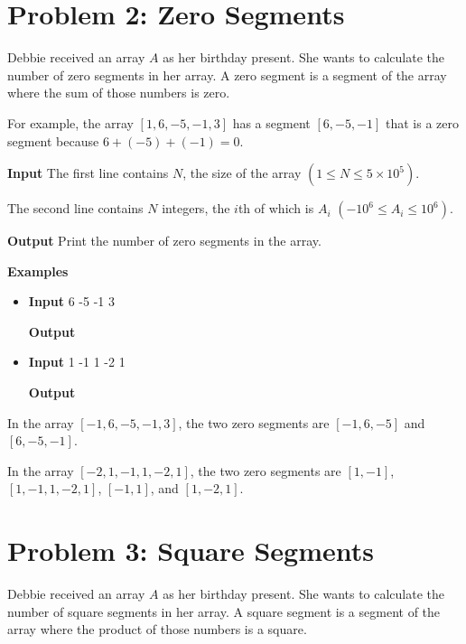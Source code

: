 \normalfont\documentclass[letterpaper,11pt]{article}
\begin{document}
\newpage

\section*{Problem 2: Zero Segments}
Debbie received an array $A$ as her birthday present. She wants to calculate the number of zero segments in her array. A zero segment is a segment of the array where the sum of those numbers is zero.

For example, the array $[1,6,-5,-1,3]$ has a segment $[6,-5,-1]$ that is a zero segment because $6 + (-5) + (-1) = 0$.

\textbf{Input} \newline
The first line contains $N$, the size of the array $(1 \leq N \leq 5 \times 10^5)$.

The second line contains $N$ integers, the $i$th of which is $A_i$ $(-10^6 \leq A_i \leq 10^6)$.

\textbf{Output} \newline
Print the number of zero segments in the array.

\textbf{Examples} \newline
\begin{itemize}
\item \textbf{Input}   6 -5 -1 3

\textbf{Output} 

\item \textbf{Input}   1 -1 1 -2 1

\textbf{Output} 
\end{itemize}

In the array $[-1, 6, -5, -1, 3]$, the two zero segments are $[-1, 6, -5]$ and $[6, -5, -1]$.

In the array $[-2, 1, -1, 1, -2, 1]$, the two zero segments are $[1, -1]$, $[1, -1, 1, -2, 1]$, $[-1, 1]$, and $[1, -2, 1]$.

\newpage

\section*{Problem 3: Square Segments}
Debbie received an array $A$ as her birthday present. She wants to calculate the number of square segments in her array. A square segment is a segment of the array where the product of those numbers is a square.
\end{document}
